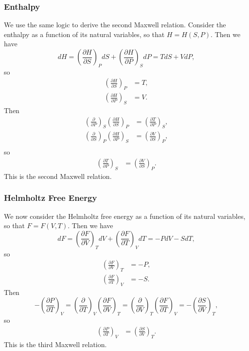 \subsubsection{Enthalpy}
We use the same logic to derive the second Maxwell relation. Consider the enthalpy as a function of its natural variables, so that $H = H(S,P)$. Then we have 
$$dH = \left(\frac{\partial H}{\partial S} \right)_P dS + \left(\frac{\partial H}{\partial P} \right)_S dP = TdS+VdP,$$
so 
\begin{align*}
 \left(\frac{\partial H}{\partial S} \right)_P &= T, \\
  \left(\frac{\partial H}{\partial P} \right)_S &= V.
\end{align*}
Then 
\begin{align*}
\left(\frac{\partial }{\partial P} \right)_S\left(\frac{\partial H}{\partial S} \right)_P &= \left(\frac{\partial T }{\partial P} \right)_S,\\
\left(\frac{\partial }{\partial S} \right)_P\left(\frac{\partial H}{\partial P} \right)_S &= \left(\frac{\partial V }{\partial S} \right)_P,\\
\end{align*}
so 
\begin{align}
 \left(\frac{\partial T }{\partial P} \right)_S &= \left(\frac{\partial V }{\partial S} \right)_P \label{eq:m2}.
\end{align}
This is the second Maxwell relation.
\subsubsection{Helmholtz Free Energy}
We now consider the Helmholtz free energy as a function of its natural variables, so that $F = F(V,T)$. Then we have 
$$dF = \left(\frac{\partial F}{\partial V} \right)_T dV + \left(\frac{\partial F}{\partial T} \right)_V dT = -PdV-SdT,$$
so 
\begin{align*}
 \left(\frac{\partial F}{\partial V} \right)_T &= -P, \\
  \left(\frac{\partial F}{\partial T} \right)_V &= -S.
\end{align*}
Then 
$$ -\left(\frac{\partial P}{\partial T} \right)_V =
 \left(\frac{\partial }{\partial T} \right)_V\left(\frac{\partial F}{\partial V} \right)_T  = \left(\frac{\partial }{\partial V} \right)_T \left(\frac{\partial F}{\partial T} \right)_V = -\left(\frac{\partial S}{\partial V} \right)_T,
$$ so 
\begin{align}
 \left(\frac{\partial P }{\partial T} \right)_V &= \left(\frac{\partial S }{\partial V} \right)_T\label{eq:m3}.
\end{align}
This is the third Maxwell relation.
